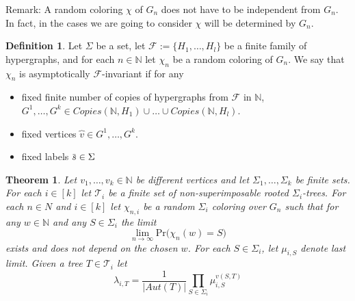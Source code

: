 \documentclass[12pt,notitlepage,a4paper]{article}
\newtheorem{theorem}{Theorem}[section]
\theoremstyle{definition}
\newtheorem{definition}{Definition}[section]
\newcommand{\N}{\mathbb{N}}
\newcommand{\Ln}{\lim\limits_{n\to \infty}}
\newcommand{\overbar}[1]{\mkern 1.5mu\overline{\mkern-1.5mu#1\mkern-1.5mu}\mkern 1.5mu}
\begin{document}
Remark: A random coloring $\chi$ of $G_n$ does not have to be independent from
$G_n$. In fact, in the cases we are going to consider $\chi$ will be determined
by $G_n$. 

\begin{definition}
	Let $\Sigma$ be a set, let $\mathcal{F}:=\{H_1, \dots, H_l\}$
	be a finite family of hypergraphs, and
	for each $n\in \N$ let $\chi_n$ be a random coloring of $G_n$. We say that 
	$\chi_n$ is asymptotically $\mathcal{F}$-invariant if for any 
	\begin{itemize}
		\item fixed finite number of copies of hypergraphs from 
		$\mathcal{F}$ in $\N$,
		$G^1,\dots, G^k \in Copies(\N,H_1)\cup \dots \cup Copies(\N,H_l)$.
		\item fixed vertices $\overbrace{v}\in G^1,\dots,G^k$.
		\item fixed labels $\overbar{s}\in \Sigma$
	\end{itemize}  
\end{definition}
	



\begin{theorem} 
	Let $v_1,\dots, v_k\in \N$ be different vertices and let 
	$\Sigma_1,\dots,\Sigma_k$ be finite sets. For each 
	$i\in [k]$ let $\mathcal{T}_i$ be a finite set of non-superimposable
	rooted $\Sigma_i$-trees. 
	For each $n\in N$ and $i\in [k]$ let $\chi_{n,i}$ be a random 
	$\Sigma_i$ coloring over $G_n$ such that for any $w\in \N$ and any $S \in \Sigma_i$
	the limit
	\[
	\Ln \mathrm{Pr}\big( \chi_n(w)=S\big)
	\]
	exists and does not depend on the chosen $w$. For each 
	$S \in \Sigma_i$, let $\mu_{i,S}$ denote last limit. 
	Given a tree $T\in \mathcal{T}_i$ let
	\[
	\lambda_{i,T}=\frac{1}{|Aut(T)|}\prod_{S\in \Sigma_i} \mu_{i,S}^{v(S,T)} 
	\]	
\end{theorem}
\end{document}
